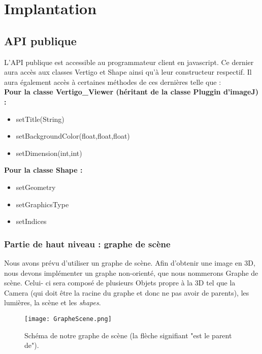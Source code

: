 \documentclass[11pt]{report}
\begin{document}
\chapter{Implantation} %
\section{API publique} 
L'API publique est accessible au programmateur client en javascript.
Ce dernier aura accès aux classes Vertigo et Shape ainsi qu'à leur constructeur respectif.
Il aura également accès à certaines méthodes de ces dernières telle que : 
\\

\textbf{Pour la classe Vertigo\_Viewer (héritant de la classe Pluggin d'imageJ) :}
\begin{itemize}
\item setTitle(String)
\item setBackgroundColor(float,float,float)
\item setDimension(int,int)
\end{itemize}


\textbf{Pour la classe Shape :}
\begin{itemize}
\item setGeometry %
\item setGraphicsType
\item setIndices %
\end{itemize}

\subsection{Partie de haut niveau : graphe de scène}
Nous avons prévu d'utiliser un graphe de scène. 
Afin d'obtenir une image en 3D, nous devons implémenter un graphe non-orienté, que nous nommerons Graphe de scène. Celui- ci sera composé de plusieurs Objets propre à la 3D tel que la Camera (qui doit être la racine du graphe et donc ne pas avoir de parents), les lumières, la scène et les  \textit{shapes}. 

\begin{figure}[h!]
  \caption{Schéma de notre graphe de scène (la flèche signifiant "est le parent de").}
  \centering
    \texttt{[image: GrapheScene.png]} 
    \label{SchemaGrapheSceneSimple}
\end{figure}
 
\end{document}

